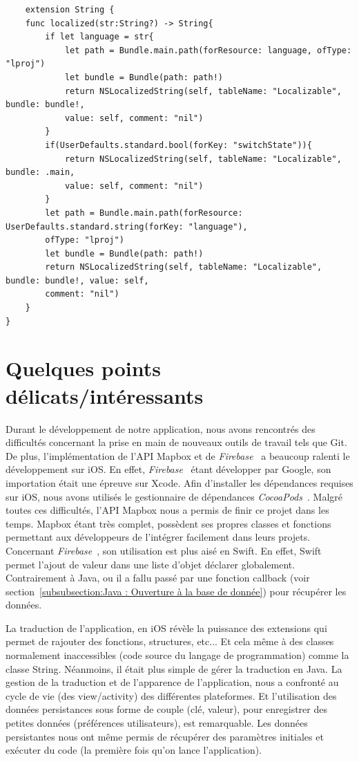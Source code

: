\documentclass{article}
\begin{document}
\begin{verbatim}
    extension String {
    func localized(str:String?) -> String{
        if let language = str{
            let path = Bundle.main.path(forResource: language, ofType: "lproj")
            let bundle = Bundle(path: path!)
            return NSLocalizedString(self, tableName: "Localizable", bundle: bundle!,
            value: self, comment: "nil")
        }
        if(UserDefaults.standard.bool(forKey: "switchState")){
            return NSLocalizedString(self, tableName: "Localizable", bundle: .main,
            value: self, comment: "nil")
        }
        let path = Bundle.main.path(forResource: UserDefaults.standard.string(forKey: "language"), 
        ofType: "lproj")
        let bundle = Bundle(path: path!)
        return NSLocalizedString(self, tableName: "Localizable", bundle: bundle!, value: self,
        comment: "nil")
    }
}  
\end{verbatim}


\newpage %


\section{Quelques points délicats/intéressants}

Durant le développement de notre application, nous avons rencontrés des difficultés concernant la prise en main
de nouveaux outils de travail tels que Git.
De plus, l'implémentation de l'API Mapbox et de \textit{Firebase}~\cite{firebaseDoc} a beaucoup ralenti
le développement sur iOS. En effet, \textit{Firebase}~\cite{firebaseDoc} étant développer par Google, son importation
était une épreuve sur Xcode. Afin d'installer les dépendances requises sur iOS, nous avons utilisés
le gestionnaire de dépendances \textit{CocoaPods}~\cite{cocoapodsDoc}.
Malgré toutes ces difficultés, l'API Mapbox nous a permis de finir ce projet dans les temps.
Mapbox étant très complet, possèdent ses propres classes et fonctions permettant aux développeurs de l'intégrer facilement dans leurs projets.
Concernant \textit{Firebase}~\cite{firebaseDoc}, son utilisation est plus aisé en Swift. En effet, Swift permet
l'ajout de valeur dans une liste d'objet déclarer globalement. Contrairement à Java, ou il a fallu passé par une
fonction callback (voir section~\ref{subsubsection:Java : Ouverture à la base de donnée}) pour récupérer les données.

La traduction de l'application, en iOS révèle la puissance des extensions qui permet de rajouter des fonctions, structures, etc...
Et cela même à des classes normalement inaccessibles (code source du langage de programmation) comme la classe String. Néanmoins, il était plus simple de gérer la traduction en Java.
La gestion de la traduction et de l'apparence de l'application, nous a confronté au cycle de vie (des view/activity) des différentes plateformes.
Et l'utilisation des données persistances sous forme de couple (clé, valeur), pour enregistrer des petites données (préférences utilisateurs), est remarquable.
Les données persistantes nous ont même permis de récupérer des paramètres initiales et exécuter du code (la première fois qu'on lance l'application).
\end{document}
